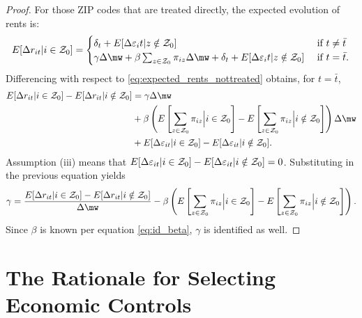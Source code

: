 \begin{proof}
    For those ZIP codes that are treated directly, the expected evolution of 
    rents is:
    \begin{equation*}\label{eq:expected_rents_treated}
        E[\Delta r_{it} | i\in\Z_0] = 
        \begin{cases}
            \delta_t + E[\Delta \varepsilon_it | z\notin\Z_0] 
                                       & \text{ if } t\neq\bar{t} \\
            \gamma\Delta\mw + \beta\sum_{z\in\Z_0}\pi_{iz}\Delta\mw + \delta_t 
                     + E[\Delta \varepsilon_it | z\notin\Z_0] 
                                       & \text{ if } t=\bar{t} .
        \end{cases}
    \end{equation*}
    Differencing with respect to \ref{eq:expected_rents_nottreated} obtains, 
    for $t=\bar{t}$,
    \begin{equation*}
        \begin{split}
            E[\Delta r_{it} | i\in\Z_0] - E[\Delta r_{it} | i\notin\Z_0] 
              & = \gamma \Delta \mw  \\
              & + \beta \left(E\left[\sum_{z\in\Z_0}\pi_{iz} \Big| i\in\Z_0\right]
                           - E\left[\sum_{z\in\Z_0}\pi_{iz} \Big| i\notin\Z_0\right]\right) \Delta \mw  \\
              & + E[\Delta \varepsilon_{it} | i\in\Z_0] - E[\Delta \varepsilon_{it} | i\notin\Z_0] .
        \end{split}
    \end{equation*}
    Assumption (iii) means that
    $E[\Delta \varepsilon_{it} | i\in\mathcal{Z}_0] - E[\Delta \varepsilon_{it} | i\notin\mathcal{Z}_0]=0$.
    Substituting in the previous equation yields
    \begin{equation}\label{eq:id_gamma}
        \gamma = \frac{E[\Delta r_{it} | i\in\Z_0] - E[\Delta r_{it} | i\notin\Z_0]}{\Delta\mw}
            - \beta \left(E\left[\sum_{z\in\Z_0}\pi_{iz} \Big| i\in\Z_0   \right] 
                        - E\left[\sum_{z\in\Z_0}\pi_{iz} \Big| i\notin\Z_0\right]\right) .
    \end{equation}
    Since $\beta$ is known per equation \ref{eq:id_beta}, $\gamma$ is identified
    as well.
\end{proof}


\clearpage
\section{The Rationale for Selecting Economic Controls}\label{sec:app_econ_control}

